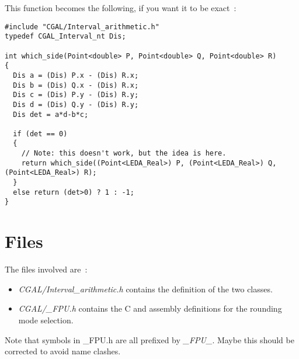This function becomes the following, if you want it to be exact~:

\begin{verbatim}
#include "CGAL/Interval_arithmetic.h"
typedef CGAL_Interval_nt Dis;

int which_side(Point<double> P, Point<double> Q, Point<double> R)
{
  Dis a = (Dis) P.x - (Dis) R.x;
  Dis b = (Dis) Q.x - (Dis) R.x;
  Dis c = (Dis) P.y - (Dis) R.y;
  Dis d = (Dis) Q.y - (Dis) R.y;
  Dis det = a*d-b*c;

  if (det == 0)
  {
    // Note: this doesn't work, but the idea is here.
    return which_side((Point<LEDA_Real>) P, (Point<LEDA_Real>) Q, (Point<LEDA_Real>) R);
  }
  else return (det>0) ? 1 : -1;
}
\end{verbatim}


\section{Files}

The files involved are~:
\begin{itemize}
\item {\it CGAL/Interval\_arithmetic.h} contains the definition of the
      two classes.
\item {\it CGAL/\_FPU.h} contains the C and assembly definitions for the
      rounding mode selection.
\end{itemize}

\bigskip

Note that symbols in \_FPU.h are all prefixed by {\it \_FPU\_}.  Maybe this
should be corrected to avoid name clashes.

% 
